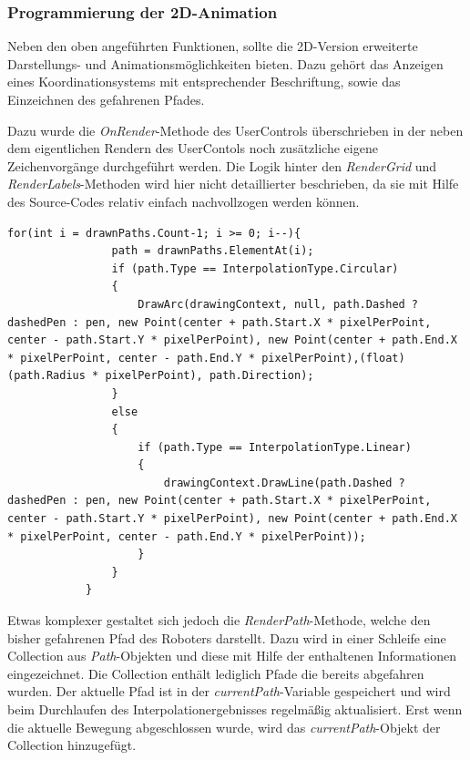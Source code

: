 \subsubsection{Programmierung der 2D-Animation}

Neben den oben angeführten Funktionen, sollte die 2D-Version erweiterte Darstellungs- und Animationsmöglichkeiten bieten. Dazu gehört das Anzeigen eines Koordinationsystems mit entsprechender Beschriftung, sowie das Einzeichnen des gefahrenen Pfades.

Dazu wurde die \textit{OnRender}-Methode des UserControls überschrieben in der neben dem eigentlichen Rendern des UserContols noch zusätzliche eigene Zeichenvorgänge durchgeführt werden.
Die Logik hinter den \textit{RenderGrid} und \textit{RenderLabels}-Methoden wird hier nicht detaillierter beschrieben, da sie mit Hilfe des Source-Codes relativ einfach nachvollzogen werden können.

\begin{lstlisting}[language=CSharp, caption={Ausschnitt aus der RenderPath-Methode der 2D-Visualisierung}, captionpos=b]
for(int i = drawnPaths.Count-1; i >= 0; i--){
                path = drawnPaths.ElementAt(i);
                if (path.Type == InterpolationType.Circular)
                {
                    DrawArc(drawingContext, null, path.Dashed ? dashedPen : pen, new Point(center + path.Start.X * pixelPerPoint, center - path.Start.Y * pixelPerPoint), new Point(center + path.End.X * pixelPerPoint, center - path.End.Y * pixelPerPoint),(float) (path.Radius * pixelPerPoint), path.Direction);
                }
                else
                {
                    if (path.Type == InterpolationType.Linear)
                    {
                        drawingContext.DrawLine(path.Dashed ? dashedPen : pen, new Point(center + path.Start.X * pixelPerPoint, center - path.Start.Y * pixelPerPoint), new Point(center + path.End.X * pixelPerPoint, center - path.End.Y * pixelPerPoint));
                    }
                }
            }
\end{lstlisting}

Etwas komplexer gestaltet sich jedoch die \textit{RenderPath}-Methode, welche den bisher gefahrenen Pfad des Roboters darstellt. Dazu wird in einer Schleife eine Collection aus \textit{Path}-Objekten und diese mit Hilfe der enthaltenen Informationen eingezeichnet. Die Collection enthält lediglich Pfade die bereits abgefahren wurden. Der aktuelle Pfad ist in der \textit{currentPath}-Variable gespeichert und wird beim Durchlaufen des Interpolationergebnisses regelmäßig aktualisiert. Erst wenn die aktuelle Bewegung abgeschlossen wurde, wird das \textit{currentPath}-Objekt der Collection hinzugefügt.

